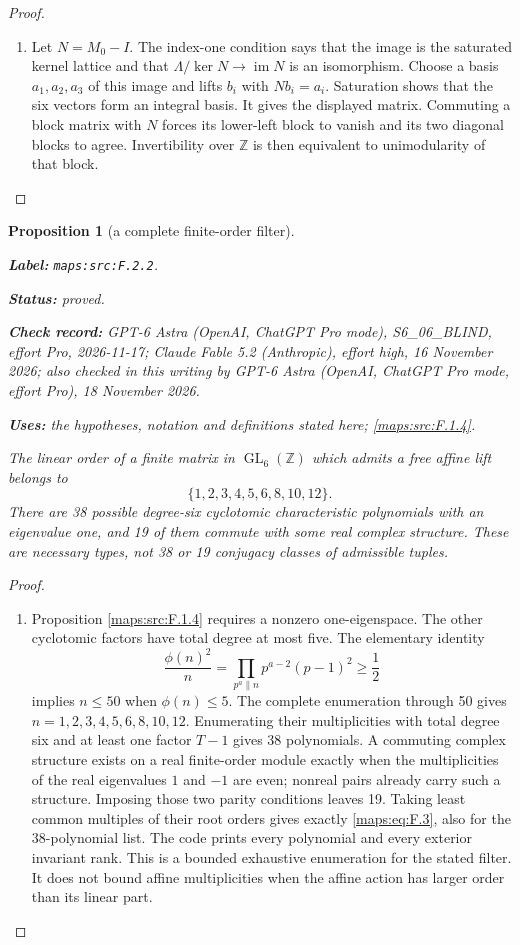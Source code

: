 \documentclass[11pt,a4paper]{article}
\newtheorem{proposition}[proposition]{Proposition}
\theoremstyle{definition}
\newcommand{\StatementRecord}[4]{\par\smallskip\begingroup\upshape\raggedright\noindent\textbf{Label:} \nolinkurl{#1}.\par\noindent\textbf{Status:} #2.\par\noindent\textbf{Check record:} #3.\par\noindent\textbf{Uses:} #4.\par\endgroup\smallskip}
\newcommand{\CurrentChecker}{GPT-6 Astra (OpenAI, ChatGPT Pro mode, effort Pro), 18 November 2026}
\begin{document}
\begin{proof}
\begin{enumerate}[label=\arabic*.]
\item Let $N=M_0-I$.  The index-one condition says that the image
is the saturated kernel lattice and that
$\Lambda/\ker N\to\operatorname{im}N$ is an isomorphism.
Choose a basis $a_1,a_2,a_3$ of this image and lifts $b_i$ with
$Nb_i=a_i$.  Saturation shows that the six vectors form an
integral basis.  It gives the displayed matrix.  Commuting a
block matrix with $N$ forces its lower-left block to vanish
and its two diagonal blocks to agree.  Invertibility over
$\mathbb Z$ is then equivalent to unimodularity of that block.

\end{enumerate}
\end{proof}




\begin{proposition}[a complete finite-order filter]\label{maps:src:F.2.2}
\StatementRecord{maps:src:F.2.2}{proved}{GPT-6 Astra (OpenAI, ChatGPT Pro mode), S6\_06\_BLIND, effort Pro, 2026-11-17; Claude Fable 5.2 (Anthropic), effort high, 16 November 2026; also checked in this writing by \CurrentChecker}{the hypotheses, notation and definitions stated here; \cref{maps:src:F.1.4}}


The linear order of a finite matrix in $\operatorname{GL}_6(\mathbb Z)$
which admits a free affine lift belongs to
\[
 \{1,2,3,4,5,6,8,10,12\}.
 \tag{F.3}\label{maps:eq:F.3}
\]
There are 38 possible degree-six cyclotomic characteristic
polynomials with an eigenvalue one, and 19 of them commute
with some real complex structure.  These are necessary types,
not 38 or 19 conjugacy classes of admissible tuples.

\end{proposition}


\begin{proof}
\begin{enumerate}[label=\arabic*.]
\item Proposition \ref{maps:src:F.1.4} requires a nonzero one-eigenspace.  The other
cyclotomic factors have total degree at most five.  The elementary
identity
\[
 \frac{\phi(n)^2}{n}=
 \prod_{p^a\parallel n}p^{a-2}(p-1)^2\geq\frac12
\]
implies $n\leq50$ when $\phi(n)\leq5$.
The complete enumeration through 50 gives
$n=1,2,3,4,5,6,8,10,12$.  Enumerating their multiplicities
with total degree six and at least one factor $T-1$ gives 38
polynomials.  A commuting complex structure exists on a real
finite-order module exactly when the multiplicities of the
real eigenvalues $1$ and $-1$ are even; nonreal pairs already
carry such a structure.  Imposing those two parity conditions
leaves 19.  Taking least common multiples of their root orders
gives exactly \eqref{maps:eq:F.3}, also for the 38-polynomial list.
The code prints every polynomial and every exterior invariant
rank.  This is a bounded exhaustive enumeration for the
stated filter.  It does not bound affine multiplicities when
the affine action has larger order than its linear part.

\end{enumerate}
\end{proof}
\end{document}
